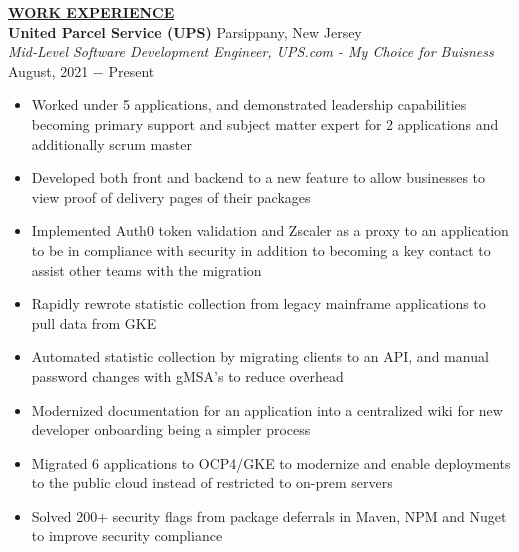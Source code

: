 \documentclass{article}
\begin{document}
% 
%
\noindent \textbf{\underline{WORK EXPERIENCE}} \\
\noindent \textbf{United Parcel Service (UPS)} \hfill Parsippany, New Jersey \\
\textit{Mid-Level Software Development Engineer, UPS.com - My Choice for Buisness} \hfill August, 2021 $-$ Present
\begin{itemize}[noitemsep,nolistsep,leftmargin=*]
\item {Worked under 5 applications, and demonstrated leadership capabilities becoming primary support and subject matter expert for 2 applications and additionally scrum master}
\item {Developed both front and backend to a new feature to allow businesses to view proof of delivery pages of their packages }
\item {Implemented Auth0 token validation and Zscaler as a proxy to an application to be in compliance with security in addition to becoming a key contact to assist other teams with the migration}
\item {Rapidly rewrote statistic collection from legacy mainframe applications to pull data from GKE}
\item {Automated statistic collection by migrating clients to an API, and manual password changes with gMSA's to reduce overhead}
\item {Modernized documentation for an application into a centralized wiki for new developer onboarding being a simpler process}
\item {Migrated 6 applications to OCP4/GKE to modernize and enable deployments to the public cloud instead of restricted to on-prem servers}
\item {Solved 200+ security flags from package deferrals in Maven, NPM and Nuget to improve security compliance}\\
\end{itemize}
\end{document}
